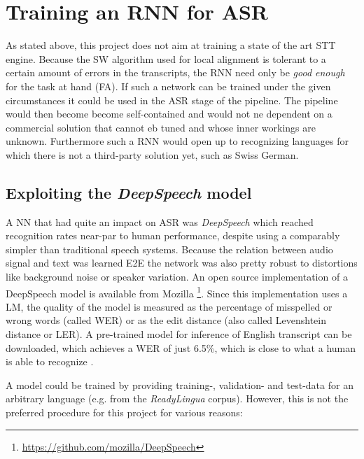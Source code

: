\section{Training an \ac{RNN} for \ac{ASR}}\label{ds}
As stated above, this project does not aim at training a state of the art \ac{STT} engine. Because the \ac{SW} algorithm used for local alignment is tolerant to a certain amount of errors in the transcripts, the \ac{RNN} need only be \textit{good enough} for the task at hand (\ac{FA}). If such a network can be trained under the given circumstances it could be used in the \ac{ASR} stage of the pipeline. The pipeline would then become become self-contained and would not ne dependent on a commercial solution that cannot eb tuned and whose inner workings are unknown. Furthermore such a \ac{RNN} would open up to recognizing languages for which there is not a third-party solution yet, such as Swiss German.

\subsection{Exploiting the \textit{DeepSpeech} model}

A \ac{NN} that had quite an impact on \ac{ASR} was \textit{DeepSpeech} \cite{deepspeech} which reached recognition rates near-par to human performance, despite using a comparably simpler than traditional speech systems. Because the relation between audio signal and text was learned \ac{E2E} the network was also pretty robust to distortions like background noise or speaker variation. An open source implementation of a DeepSpeech model is available from Mozilla \footnote{\url{https://github.com/mozilla/DeepSpeech}}. Since this implementation uses a \ac{LM}, the quality of the model is measured as the percentage of misspelled or wrong words (called \ac{WER}) or as the edit distance (also called Levenshtein distance or \ac{LER}). A pre-trained model for inference of English transcript can be downloaded, which achieves a \ac{WER} of just 6.5\%, which is close to what a human is able to recognize \cite{mozillajourney}.

A model could be trained by providing training-, validation- and test-data for an arbitrary language (e.g. from the \textit{ReadyLingua} corpus). However, this is not the preferred procedure for this project for various reasons:

